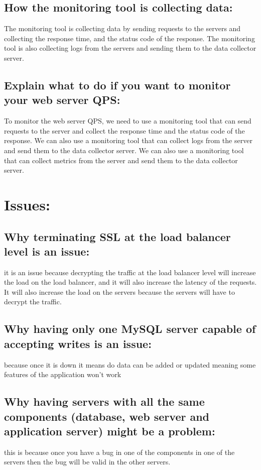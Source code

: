 \documentclass[a4paper, 10pt]{article}
\begin{document}
    \subsection*{How the monitoring tool is collecting data: }
        The monitoring tool is collecting data by sending requests to the servers and collecting the 
        response time, and the status code of the response. The monitoring tool is also collecting 
        logs from the servers and sending them to the data collector server.
    \subsection*{Explain what to do if you want to monitor your web server QPS: }
        To monitor the web server QPS, we need to use a monitoring tool that can send requests to the 
        server and collect the response time and the status code of the response. We can also use a 
        monitoring tool that can collect logs from the server and send them to the data collector 
        server. We can also use a monitoring tool that can collect metrics from the server and send 
        them to the data collector server.
\section*{Issues: }
    \subsection*{Why terminating SSL at the load balancer level is an issue: }
        it is an issue because decrypting the traffic at the load balancer level will increase the
        load on the load balancer, and it will also increase the latency of the requests. It will also
        increase the load on the servers because the servers will have to decrypt the traffic.
    \subsection*{Why having only one MySQL server capable of accepting writes is an issue: }
        because once it is down it means do data can be added or updated meaning some
        features of the application won’t work
    \subsection*{Why having servers with all the same components (database, web server and
    application server) might be a problem: }
    this is because once you have a bug in one of
    the components in one of the servers then the bug will be valid in the other servers.
\end{document}

